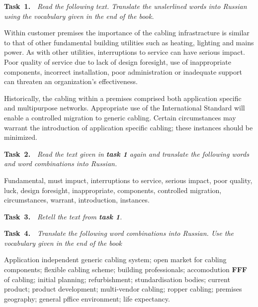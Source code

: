 {\bf Task~1.}~~{\it Read the following text. Translate the unslerlined words into Russian using the
vocabulary given in the end of the book.}\par
Within customer premises the importance of the cabling infrastracture is similar to that of other
fundamental building utilities such as heating, lighting and mains power. As with other utilities,
interruptions to service can have serious impact. Poor quality of service due to lack of design foresight,
use of inappropriate components, incorrect installation, poor administration or inadequate support can
threaten an organization's effectiveness.\par
Historically, the cabling within a premises comprised both application specific and multipurpose
networks. Appropriate use of the International Standard will enable a controlled migration to generic
cabling. Certain circumstances may warrant the introduction of application specific cabling; these
instances should be minimized.\par

{\bf Task~2.}~~{\it Read the text given in {\bf task 1} again and translate the following words and word
combinations into Russian.}\par
Fundamental, must impuct, interruptions to service, serious impact, poor quality, luck, design
foresight, inappropriate, components, controlled migration, circumstances, warrant, introduction, instances.\par

{\bf Task~3.}~~{\it Retell the text from {\bf task 1}.}\par

{\bf Task~4.}~~{\it Translate the following word combinations into Russian. Use the vocabulary given in the end
of the book}\par
Application independent generic cabling system; open market for cabling components; flexible
cabling scheme; building professionals; accomodution \textbf{FFF} of cabling; initial planning; refurbishment;
stundardisation bodies; current product; product development; multi-vendor cabling; ropper cabling;
premises geography; general pffice environment; life expectancy.\par

